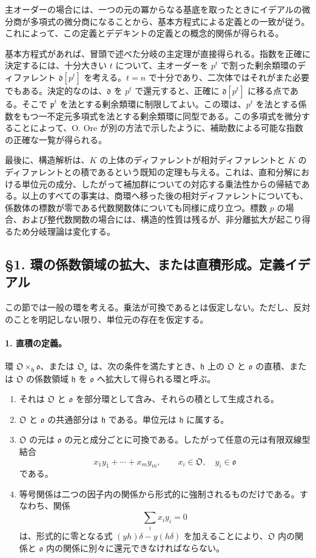 \documentclass[11pt]{article}
\begin{document}
主オーダーの場合には、一つの元の冪からなる基底を取ったときにイデアルの微分商が多項式の微分商になることから、基本方程式による定義との一致が従う。これによって、この定義とデデキントの定義との概念的関係が得られる。

基本方程式があれば、冒頭で述べた分岐の主定理が直接得られる。指数を正確に決定するには、十分大きい \(t\) について、主オーダーを \(p^t\) で割った剰余類環のディファレント \(\mathfrak d[p^t]\) を考える。\(t=n\) で十分であり、二次体ではそれがまた必要でもある。決定的なのは、\(\mathfrak d\) を \(p^t\) で還元すると、正確に \(\mathfrak d[p^t]\) に移る点である。そこで \(\mathfrak p^t\) を法とする剰余類環に制限してよい。この環は、\(p^t\) を法とする係数をもつ一不定元多項式を法とする剰余類環に同型である。この多項式を微分することによって、O. Ore が別の方法で示したように、補助数による可能な指数の正確な一覧が得られる。

最後に、構造解析は、\(K\) の上体のディファレントが相対ディファレントと \(K\) のディファレントとの積であるという既知の定理も与える。これは、直和分解における単位元の成分、したがって補加群についての対応する乗法性からの帰結である。以上のすべての事実は、商環へ移った後の相対ディファレントについても、係数体の標数が零である代数関数体についても同様に成り立つ。標数 \(p\) の場合、および整代数関数の場合には、構造的性質は残るが、非分離拡大が起こり得るため分岐理論は変化する。

\subsection*{§1. 環の係数領域の拡大、または直積形成。定義イデアル}

この節では一般の環を考える。乗法が可換であるとは仮定しない。ただし、反対のことを明記しない限り、単位元の存在を仮定する。

\paragraph{1. 直積の定義。}
環 \(\mathfrak O\times_{\mathfrak h}\mathfrak o\)、または \(\mathfrak O_{\mathfrak o}\) は、次の条件を満たすとき、\(\mathfrak h\) 上の \(\mathfrak O\) と \(\mathfrak o\) の直積、または \(\mathfrak O\) の係数領域 \(\mathfrak h\) を \(\mathfrak o\) へ拡大して得られる環と呼ぶ。

\begin{enumerate}
\item それは \(\mathfrak O\) と \(\mathfrak o\) を部分環として含み、それらの積として生成される。
\item \(\mathfrak O\) と \(\mathfrak o\) の共通部分は \(\mathfrak h\) である。単位元は \(\mathfrak h\) に属する。
\item \(\mathfrak O\) の元は \(\mathfrak o\) の元と成分ごとに可換である。したがって任意の元は有限双線型結合
\[
        x_1y_1+\cdots+x_my_m,
        \qquad x_i\in\mathfrak O,
        \quad y_i\in\mathfrak o
\]
である。
\item 等号関係は二つの因子内の関係から形式的に強制されるものだけである。すなわち、関係
\[
        \sum_i x_i y_i=0
\]
は、形式的に零となる式 \((yh)\delta-y(h\delta)\) を加えることにより、\(\mathfrak O\) 内の関係と \(\mathfrak o\) 内の関係に別々に還元できなければならない。
\end{enumerate}
\end{document}
